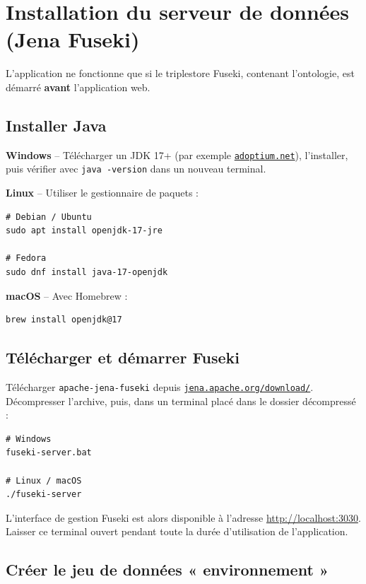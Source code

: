 ﻿\documentclass[12pt,a4paper]{report}
\begin{document}
\chapter{Installation du serveur de données (Jena Fuseki)}

L'application ne fonctionne que si le triplestore Fuseki, contenant l'ontologie, est démarré
\textbf{avant} l'application web.

\section{Installer Java}

\textbf{Windows} -- Télécharger un JDK 17+ (par exemple \href{https://adoptium.net}{\texttt{adoptium.net}}),
l'installer, puis vérifier avec \texttt{java -version} dans un nouveau terminal.

\textbf{Linux} -- Utiliser le gestionnaire de paquets :

\begin{lstlisting}
# Debian / Ubuntu
sudo apt install openjdk-17-jre

# Fedora
sudo dnf install java-17-openjdk
\end{lstlisting}

\textbf{macOS} -- Avec Homebrew :

\begin{lstlisting}
brew install openjdk@17
\end{lstlisting}

\section{Télécharger et démarrer Fuseki}

Télécharger \texttt{apache-jena-fuseki} depuis \href{https://jena.apache.org/download/}{\texttt{jena.apache.org/download/}}.
Décompresser l'archive, puis, dans un terminal placé dans le dossier décompressé :

\begin{lstlisting}
# Windows
fuseki-server.bat

# Linux / macOS
./fuseki-server
\end{lstlisting}

\noindent L'interface de gestion Fuseki est alors disponible à l'adresse
\url{http://localhost:3030}. Laisser ce terminal ouvert pendant toute la durée
d'utilisation de l'application.

\section{Créer le jeu de données « environnement »}
\end{document}
